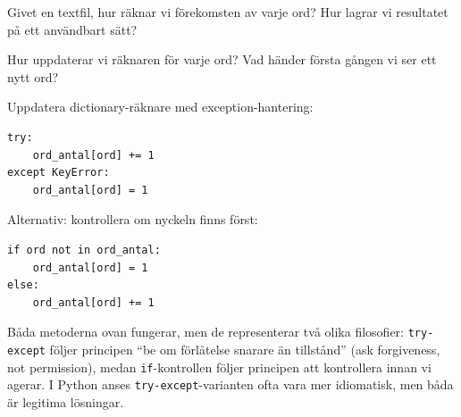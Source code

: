 \begin{frame}[fragile]
  \begin{exercise}[Problemet]
    Givet en textfil, hur räknar vi förekomsten av varje ord?
    Hur lagrar vi resultatet på ett användbart sätt?
  \end{exercise}
\end{frame}


\begin{frame}[fragile]
  \begin{exercise}
    Hur uppdaterar vi räknaren för varje ord?
    Vad händer första gången vi ser ett nytt ord?
  \end{exercise}
\end{frame}


\begin{frame}[fragile]
  \begin{example}
    Uppdatera dictionary-räknare med exception-hantering:
    \begin{verbatim}
try:
    ord_antal[ord] += 1
except KeyError:
    ord_antal[ord] = 1
    \end{verbatim}
  \end{example}

  \pause

  \begin{example}
    Alternativ: kontrollera om nyckeln finns först:
    \begin{verbatim}
if ord not in ord_antal:
    ord_antal[ord] = 1
else:
    ord_antal[ord] += 1
    \end{verbatim}
  \end{example}
\end{frame}


Båda metoderna ovan fungerar, men de representerar två olika filosofier: \texttt{try-except} följer principen \enquote{be om förlåtelse snarare än tillstånd} (\foreignlanguage{english}{ask forgiveness, not permission}), medan \texttt{if}-kontrollen följer principen att kontrollera innan vi agerar. I Python anses \texttt{try-except}-varianten ofta vara mer idiomatisk, men båda är legitima lösningar.

